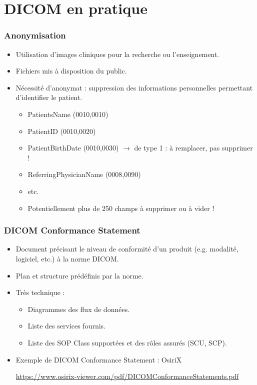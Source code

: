 \section{DICOM en pratique}

\frame
{
	\frametitle{Anonymisation}
	\begin{itemize}
		\item Utilisation d'images cliniques pour la recherche ou l'enseignement.
		\item<2-> Fichiers mis \`a disposition du public.
		\item<3-> N\'ecessit\'e d'anonymat : suppression des informations personnelles permettant d'identifier le patient.
		\begin{itemize}
			\item<4-> PatientsName (0010,0010)
			\item<5-> PatientID (0010,0020)
			\item<6-> PatientBirthDate (0010,0030) $\rightarrow$ de type 1 : \`a remplacer, pas supprimer !
			\item<7-> ReferringPhysicianName (0008,0090)
			\item<7-> etc.
			\item<8-> Potentiellement plus de 250 champs \`a supprimer ou \`a vider !
		\end{itemize}
	\end{itemize}
}

\frame
{
	\frametitle{DICOM Conformance Statement}
	\begin{itemize}
		\item Document pr\'ecisant le niveau de conformit\'e d'un produit (e.g. modalit\'e, logiciel, etc.) \`a la norme DICOM.
		\item<2-> Plan et structure pr\'ed\'efinis par la norme.
		\item<3-> Tr\`es technique :
		\begin{itemize}
			\item<4-> Diagrammes des flux de donn\'ees.
			\item<5-> Liste des services fournis.
			\item<6-> Liste des SOP Class support\'ees et des r\^oles assur\'es (SCU, SCP).
		\end{itemize}
		\item<7-> Exemple de DICOM Conformance Statement : OsiriX
		
		\url{https://www.osirix-viewer.com/pdf/DICOMConformanceStatements.pdf}
	\end{itemize}
}

